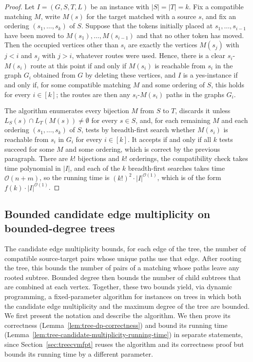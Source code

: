 \documentclass[a4paper,USenglish,thm-restate]{lipics-v2021}
\theoremstyle{problemstyle}
\begin{document}
\begin{proof}
Let $I=(G,S,T,L)$ be an instance with $|S|=|T|=k$. Fix a compatible matching
$M$, write $M(s)$ for the target matched with a source $s$, and fix an
ordering $(s_1,\ldots,s_k)$ of $S$. Suppose that the tokens initially placed
at $s_1,\ldots,s_{i-1}$ have been moved to $M(s_1),\ldots,M(s_{i-1})$ and
that no other token has moved. Then the occupied vertices other than $s_i$
are exactly the vertices $M(s_j)$ with $j<i$ and $s_j$ with $j>i$, whatever
routes were used. Hence, there is a clear $s_i$-$M(s_i)$ route at this point
if and only if $M(s_i)$ is reachable from $s_i$ in the graph $G_i$ obtained
from $G$ by deleting these vertices, and $I$ is a yes-instance if and only
if, for some compatible matching $M$ and some ordering of $S$, this holds
for every $i\in[k]$; the routes are then any $s_i$-$M(s_i)$ paths in the
graphs $G_i$.

The algorithm enumerates every bijection $M$ from $S$ to $T$, discards it
unless $L_S(s)\cap L_T(M(s))\neq\emptyset$ for every $s\in S$, and, for
each remaining $M$ and each ordering $(s_1,\ldots,s_k)$ of $S$, tests by
breadth-first search whether $M(s_i)$ is reachable from $s_i$ in $G_i$ for
every $i\in[k]$. It accepts if and only if all $k$ tests succeed for some
$M$ and some ordering, which is correct by the previous paragraph. There are
$k!$ bijections and $k!$ orderings, the compatibility check takes time
polynomial in $|I|$, and each of the $k$ breadth-first searches takes time
$\mathcal{O}(n+m)$, so the running time is
$(k!)^2\cdot|I|^{\mathcal{O}(1)}$, which is of the form
$f(k)\cdot|I|^{\mathcal{O}(1)}$.
\end{proof}

\subsection{Bounded candidate edge multiplicity on bounded-degree trees}
\label{sec:treefpt}

The candidate edge multiplicity bounds, for each edge of the tree, the number of compatible source-target pairs whose unique paths use that edge. After rooting the tree, this bounds the number of pairs of a matching whose paths leave any rooted subtree. Bounded degree then bounds the number of child subtrees that are combined at each vertex. Together, these two bounds yield, via dynamic programming, a fixed-parameter algorithm for instances on trees in which both the candidate edge multiplicity and the maximum degree of the tree are bounded. We first present the notation and describe the algorithm. We then prove its correctness (Lemma~\ref{lem:tree-dp-correctness}) and bound its running time (Lemma~\ref{lem:tree-candidate-multiplicity-running-time}) in separate statements, since Section~\ref{sec:treecvmfpt} reuses the algorithm and its correctness proof but bounds its running time by a different parameter.
\end{document}
